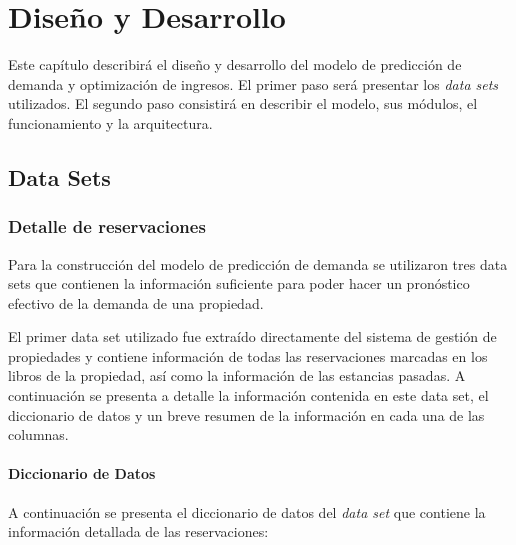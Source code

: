 \chapter{Diseño y Desarrollo}
\label{ch:modelo}

Este capítulo describirá el diseño y desarrollo del modelo de predicción de demanda y optimización de ingresos. El primer paso será presentar los \emph{data sets} utilizados. El segundo paso consistirá en describir el modelo, sus módulos, el funcionamiento y la arquitectura.

\section*{Data Sets}

\subsection*{Detalle de reservaciones}

Para la construcción del modelo de predicción de demanda se utilizaron tres data sets que contienen la información suficiente para poder hacer un pronóstico efectivo de la demanda de una propiedad.

El primer data set utilizado fue extraído directamente del sistema de gestión de propiedades y contiene información de todas las reservaciones marcadas en los libros de la propiedad, así como la información de las estancias pasadas. A continuación se presenta a detalle la información contenida en este data set, el diccionario de datos y un breve resumen de la información en cada una de las columnas.

\subsubsection*{Diccionario de Datos}

A continuación se presenta el diccionario de datos del \emph{data set} que contiene la información detallada de las reservaciones:

